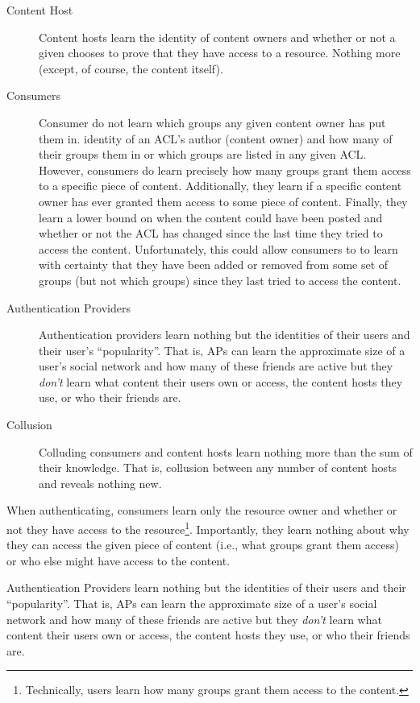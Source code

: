 \documentclass[pdftex,12pt,a4papaer]{report}
\begin{document}
\begin{compactenum}
\begin{description}
\item[Content Host] Content hosts learn the identity of content owners and
  whether or not a given chooses to prove that they have access to a resource.
  Nothing more (except, of course, the content itself).
\item[Consumers] Consumer do not learn which groups any given content owner has
put them in. identity of an ACL's author (content owner) and how many of their
groups them in or which groups are listed in any given ACL\@. However, consumers
do learn precisely how many groups grant them access to a specific piece of
content. Additionally, they learn if a specific content owner has ever granted
them access to some piece of content. Finally, they learn a lower bound on when
the content could have been posted and whether or not the ACL has changed since
the last time they tried to access the content. Unfortunately, this could allow
consumers to to learn with certainty that they have been added or removed from
some set of groups (but not which groups) since they last tried to access the
content.
\item[Authentication Providers] Authentication providers learn nothing but the
  identities of their users and their user's ``popularity''. That is, APs can
  learn the approximate size of a user's social network and how many of these
  friends are active but they \emph{don't} learn what content their users own or
  access, the content hosts they use, or who their friends are.
\item[Collusion] Colluding consumers and content hosts learn nothing more than
  the sum of their knowledge. That is, collusion between any number of content
  hosts and reveals nothing new.
\end{description}

\begin{description}
\item When authenticating, consumers learn only the resource owner and whether
  or not they have access to the resource\footnote{Technically, users learn how
  many groups grant them access to the content.}. Importantly, they learn
  nothing about why they can access the given piece of content (i.e., what groups
  grant them access) or who else might have access to the content.
\item Authentication Providers learn nothing but the identities of their users
  and their ``popularity''. That is, APs can learn the approximate size of a
  user's social network and how many of these friends are active but they
  \emph{don't} learn what content their users own or access, the content hosts
  they use, or who their friends are.
\end{description}



\end{compactenum}
\end{document}
